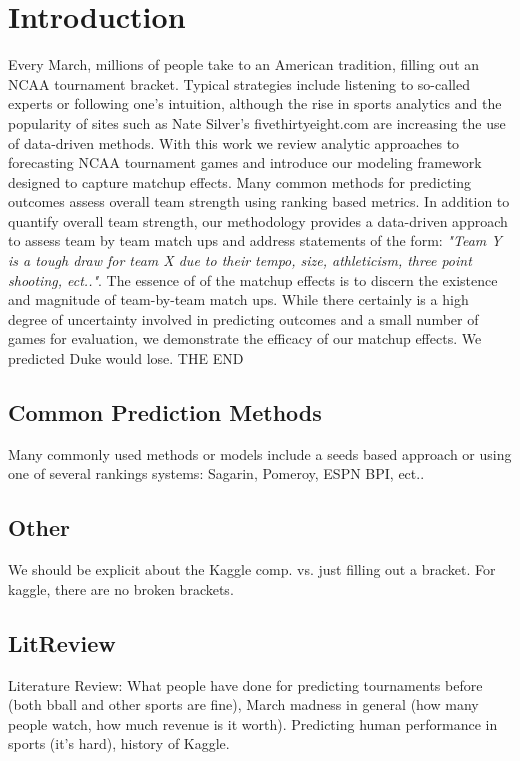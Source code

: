 \section{Introduction}
 Every March, millions of people take to an American tradition, filling out an NCAA tournament bracket.  Typical strategies include listening to so-called experts or following one's intuition, although the rise in sports analytics and the popularity of sites such as Nate Silver's fivethirtyeight.com are increasing the use of data-driven methods.  With this work we review analytic approaches to forecasting NCAA tournament games and introduce our modeling framework designed to capture matchup effects.   Many common methods for predicting outcomes assess overall team strength using ranking based metrics.  In addition to quantify overall team strength, our methodology provides a data-driven approach to assess team by team match ups and address statements of the form: \emph{"Team Y is a tough draw for team X due to their tempo, size, athleticism, three point shooting, ect.."}.  The essence of of the matchup effects is to discern the existence and magnitude of team-by-team match ups.  While there certainly is a high degree of uncertainty involved in predicting outcomes and a small number of games for evaluation, we demonstrate the efficacy of our matchup effects.  We predicted Duke would lose.  THE END
\subsection{Common Prediction Methods}
Many commonly used methods or models include a seeds based approach or using one of several rankings systems: Sagarin, Pomeroy, ESPN BPI, ect..
\subsection{Other}We should be explicit about the Kaggle comp. vs. just filling out a bracket. For kaggle, there are no broken brackets.
\subsection{LitReview}
Literature Review: What people have done for predicting tournaments before (both bball and other sports are fine), March madness in general (how many people watch, how much revenue is it worth). Predicting human performance in sports (it's hard), history of Kaggle.
